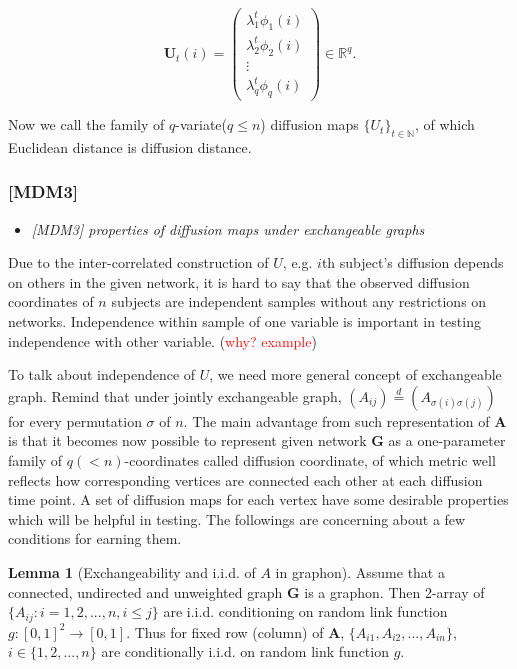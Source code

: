 \documentclass[12pt]{article}
\theoremstyle{definition}
\newtheorem{lemma}[theorem]{Lemma}
\begin{document}
\begin{equation} 
 \boldsymbol{U}_{t}(i) = \begin{pmatrix} \lambda^{t}_{1} \phi_{1}(i) \\ \lambda^{t}_{2} \phi_{2} (i)  \\ \vdots \\ \lambda^{t}_{q} \phi_{q}(i) \end{pmatrix} \in \mathbb{R}^{q}.
 \end{equation}


Now we call the family of $q$-variate($q \leq n$) diffusion maps $\{ U_{t} \}_{t \in \mathbb{N}} $, of which Euclidean distance is diffusion distance.


\subsubsection{[MDM3]}
\begin{itemize}
	\item {\it  [MDM3] properties of diffusion maps under exchangeable graphs \/}
\end{itemize}

Due to the inter-correlated construction of $U$, e.g. $i$th subject's diffusion depends on others in the given network, it is hard to say that the observed diffusion coordinates of $n$ subjects are independent samples without any restrictions on networks. Independence within sample of one variable is important in testing independence with other variable. (\textcolor{red}{why? example})

To talk about independence of $U$, we need more general concept of exchangeable graph. Remind that under jointly exchangeable graph, $(A_{ij}) \stackrel{d}{=} (A_{\sigma(i) \sigma(j)})$
for every permutation $\sigma$ of $n$. The main advantage from such representation of $\mathbf{A}$ is that it becomes now possible to represent given network $\boldsymbol{G}$ as a one-parameter family of $q(<n)$-coordinates called diffusion coordinate, of which metric well reflects how corresponding vertices are connected each other at each diffusion time point. A set of diffusion maps for each vertex have some desirable properties which will be helpful in testing. The followings are concerning about a few conditions for earning them. 

\begin{lemma}[Exchangeability and i.i.d. of $A$ in graphon]
	\label{lemma1}
	Assume that a connected, undirected and unweighted graph $\mathbf{G}$ is a graphon. Then 2-array of $\{ A_{ij} : i = 1,2,... ,n , i \leq j \}$ are i.i.d. conditioning on random link function $g : [0,1]^2 \rightarrow [0,1]$. Thus for fixed row (column) of $\mathbf{A}$, $\{ A_{i1}, A_{i2}, ... , A_{in} \}$, $i \in \{ 1,2,... , n \}$ are conditionally i.i.d. on random link function $g$.  
\end{lemma}
\end{document}
